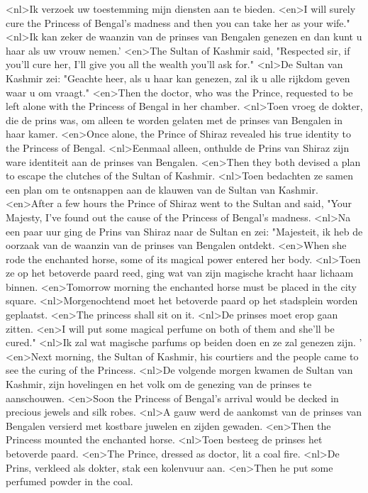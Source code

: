 <nl>Ik verzoek uw toestemming mijn diensten aan te bieden.
<en>I will surely cure the Princess of Bengal's madness and then you can take her as your wife."
<nl>Ik kan zeker de waanzin van de prinses van Bengalen genezen en dan kunt u haar als uw vrouw nemen.'
<en>The Sultan of Kashmir said, "Respected sir, if you'll cure her, I'll give you all the wealth you'll ask for."
<nl>De Sultan van Kashmir zei: "Geachte heer, als u haar kan genezen, zal ik u alle rijkdom geven waar u om vraagt."
<en>Then the doctor, who was the Prince, requested to be left alone with the Princess of Bengal in her chamber.
<nl>Toen vroeg de dokter, die de prins was, om alleen te worden gelaten met de prinses van Bengalen in haar kamer.
<en>Once alone, the Prince of Shiraz revealed his true identity to the Princess of Bengal.
<nl>Eenmaal alleen, onthulde de Prins van Shiraz zijn ware identiteit aan de prinses van Bengalen.
<en>Then they both devised a plan to escape the clutches of the Sultan of Kashmir.
<nl>Toen bedachten ze samen een plan om te ontsnappen aan de klauwen van de Sultan van Kashmir.
<en>After a few hours the Prince of Shiraz went to the Sultan and said, "Your Majesty, I've found out the cause of the Princess of Bengal's madness.
<nl>Na een paar uur ging de Prins van Shiraz naar de Sultan en zei: "Majesteit, ik heb de oorzaak van de waanzin van de prinses van Bengalen ontdekt.
<en>When she rode the enchanted horse, some of its magical power entered her body.
<nl>Toen ze op het betoverde paard reed, ging wat van zijn magische kracht  haar lichaam binnen.
<en>Tomorrow morning the enchanted horse must be placed in the city square.
<nl>Morgenochtend moet het betoverde paard op het stadsplein worden geplaatst.
<en>The princess shall sit on it.
<nl>De prinses moet erop gaan zitten.
<en>I will put some magical perfume on both of them and she'll be cured."
<nl>Ik zal wat magische parfums op beiden doen en ze zal genezen zijn. '
<en>Next morning, the Sultan of Kashmir, his courtiers and the people came to see the curing of the Princess.
<nl>De volgende morgen kwamen de Sultan van Kashmir, zijn hovelingen en het volk om de genezing van de prinses te aanschouwen.
<en>Soon the Princess of Bengal's arrival would be decked in precious jewels and silk robes.
<nl>A gauw werd de aankomst van de prinses van Bengalen  versierd met kostbare juwelen en zijden gewaden.
<en>Then the Princess mounted the enchanted horse.
<nl>Toen besteeg de prinses het betoverde paard.
<en>The Prince, dressed as doctor, lit a coal fire.
<nl>De Prins, verkleed als dokter, stak een kolenvuur aan.
<en>Then he put some perfumed powder in the coal.
